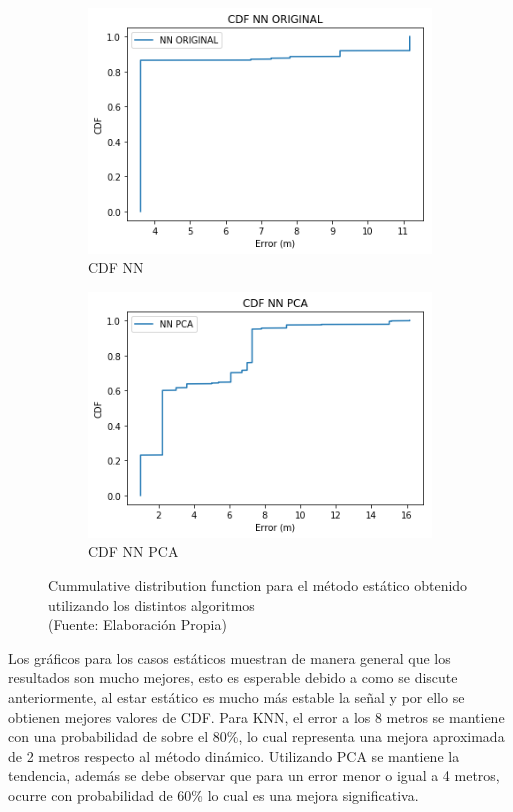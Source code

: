 \begin{figure}[ht!]
\begin{subfigure}{.5\textwidth}
  \centering
  \includegraphics[width=.8\linewidth]{figures/cdf-nn-estatico.png}
  \caption{CDF NN}
  \label{fig:sub1}
\end{subfigure}%
\begin{subfigure}{.5\textwidth}
  \centering
  \includegraphics[width=.8\linewidth]{figures/cdf-nnPCA-estatico.png}
  \caption{CDF NN PCA}
  \label{fig:sub2}
\end{subfigure}
\caption[Cummulative distribution function para el método estático]{Cummulative distribution function para el método estático obtenido utilizando los distintos algoritmos \\
{\scriptsize (Fuente: Elaboración Propia)}}
\label{fig:cdf-estaticos}
\end{figure}

Los gráficos para los casos estáticos muestran de manera general que los resultados son mucho mejores, esto es esperable debido a como se discute anteriormente, al estar estático es mucho más estable la señal y por ello se obtienen mejores valores de CDF. Para KNN, el error a los 8 metros se mantiene con una probabilidad de sobre el 80\%, lo cual representa una mejora aproximada de 2 metros respecto al método dinámico. Utilizando PCA se mantiene la tendencia, además se debe observar que para un error menor o igual a 4 metros, ocurre con probabilidad de 60\% lo cual es una mejora significativa.

